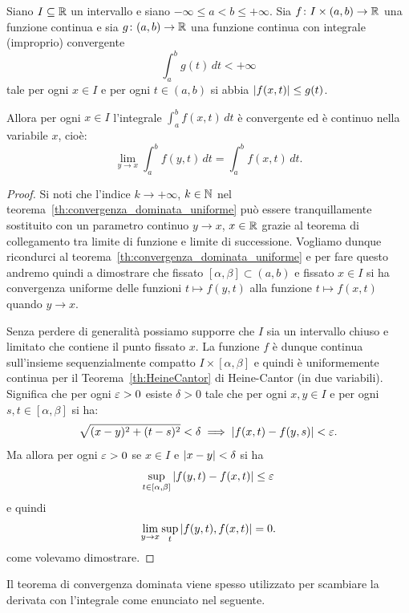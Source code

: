 \begin{theorem}
  \label{th:convergenza_dominata}%
  \mymark{**}%
Siano $I\subseteq {\mathbb R}$ un intervallo e siano 
$-\infty \le a < b \le +\infty$.
Sia $f\colon I \times(a,b)\to {\mathbb R}$ una funzione continua 
e sia $g\colon(a,b)\to {\mathbb R}$ una funzione continua con integrale 
(improprio) convergente
\[
 \int_a^b g(t)\, dt < +\infty
\]
tale per ogni $x\in I$ e per ogni $t\in(a,b)$ si abbia ${\left|f(x,t)\right|} \le g(t)$.

Allora per ogni $x\in I$ l'integrale $\int_a^b f(x,t)\, dt$ è convergente ed è continuo 
nella variabile $x$, cioè:
\[
  \lim_{y\to x} \int_a^b f(y,t)  \, dt 
  = \int_a^b f(x,t)\, dt.
\]
\end{theorem}
%
\begin{proof}
Si noti che l'indice $k\to +\infty$, $k\in {\mathbb N}$ 
nel teorema~\ref{th:convergenza_dominata_uniforme} 
può essere tranquillamente sostituito con 
un parametro continuo $y\to x$, $x\in {\mathbb R}$
grazie al teorema di collegamento tra limite 
di funzione e limite di successione.
Vogliamo dunque ricondurci al teorema~\ref{th:convergenza_dominata_uniforme} 
e per fare questo andremo quindi a dimostrare che fissato $[\alpha,\beta]\subset (a,b)$ 
e fissato $x\in I$ si ha convergenza uniforme 
delle funzioni $t\mapsto f(y,t)$ alla funzione $t\mapsto f(x,t)$
quando $y\to x$. 

Senza perdere di generalità possiamo supporre che $I$ sia un intervallo chiuso e limitato 
che contiene il punto fissato $x$. 
La funzione $f$ è dunque continua sull'insieme sequenzialmente compatto $I\times [\alpha,\beta]$ 
e quindi è uniformemente continua
per il Teorema~\ref{th:HeineCantor} di Heine-Cantor (in due variabili).
Significa che per ogni $\varepsilon>0$ esiste $\delta>0$ tale che per ogni $x,y\in I$ 
e per ogni $s,t\in[\alpha,\beta]$ si ha:
\[
\sqrt{(x-y)^2+(t-s)^2} < \delta \implies {\left|f(x,t)-f(y,s)\right|} < \varepsilon.  
\]
Ma allora per ogni $\varepsilon>0$ se $x\in I$ e ${\left|x-y\right|} < \delta$ si ha 
\[
  \sup_{t\in\left[\alpha,\beta\right]} {\left|f(y,t)-f(x,t)\right|} \le \varepsilon
\]
e quindi
\[
  \lim_{y\to x}  \sup_t {\left|f(y,t), f(x,t)\right|} = 0.
\]
come volevamo dimostrare.
\end{proof}
%
Il teorema di convergenza dominata viene spesso utilizzato 
per scambiare la derivata con l'integrale come enunciato nel seguente.
%
